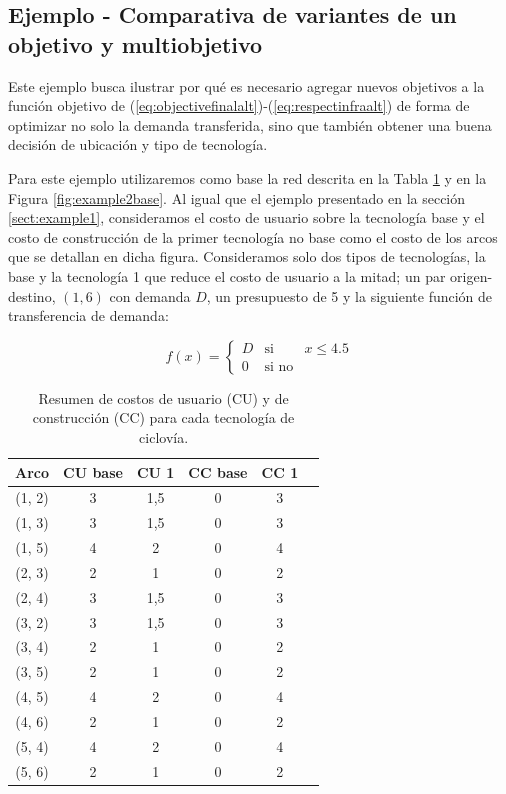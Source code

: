 \subsection{Ejemplo - Comparativa de variantes de un objetivo y multiobjetivo}
\label{sect:example2}

Este ejemplo busca ilustrar por qué es necesario agregar nuevos objetivos a la función objetivo de (\ref{eq:objectivefinalalt})-(\ref{eq:respectinfraalt}) de forma de optimizar no solo la demanda transferida, sino que también obtener una buena decisión de ubicación y tipo de tecnología.

Para este ejemplo utilizaremos como base la red descrita en la Tabla \ref{table:example2arccosts} y en la Figura \ref{fig:example2base}. Al igual que el ejemplo presentado en la sección \ref{sect:example1}, consideramos el costo de usuario sobre la tecnología base y el costo de construcción de la primer tecnología no base como el costo de los arcos que se detallan en dicha figura. Consideramos solo dos tipos de tecnologías, la base y la tecnología 1 que reduce el costo de usuario a la mitad; un par origen-destino, $(1, 6)$ con demanda $D$, un presupuesto de 5 y la siguiente función de transferencia de demanda:

$$
  f(x) = \left\{ \begin{array}{lcr}
          D & \mbox{si}   & x \leq 4.5 \\
          0 & \mbox{si no} &
        \end{array}
        \right.
$$

\begin{table}[h!]
  \centering
  \begin{tabular}{cccccc}
    \toprule
    Arco & CU base & CU 1 & CC base & CC 1 & \\
    \midrule
      (1, 2) & 3 & 1,5 & 0 & 3 \\
      (1, 3) & 3 & 1,5 & 0 & 3 \\
      (1, 5) & 4 & 2   & 0 & 4 \\
      (2, 3) & 2 & 1   & 0 & 2 \\
      (2, 4) & 3 & 1,5 & 0 & 3 \\
      (3, 2) & 3 & 1,5 & 0 & 3 \\
      (3, 4) & 2 & 1   & 0 & 2 \\
      (3, 5) & 2 & 1   & 0 & 2 \\
      (4, 5) & 4 & 2   & 0 & 4 \\
      (4, 6) & 2 & 1   & 0 & 2 \\
      (5, 4) & 4 & 2   & 0 & 4 \\
      (5, 6) & 2 & 1   & 0 & 2 \\
    \bottomrule
  \end{tabular}
    \caption{Resumen de costos de usuario (CU) y de construcción (CC) para cada tecnología de ciclovía.}\label{table:example2arccosts}
\end{table}

